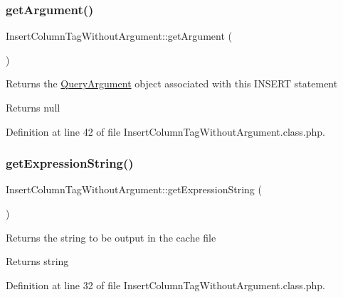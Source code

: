 \subsubsection{\texorpdfstring{get\+Argument()}{getArgument()}}
{\footnotesize\ttfamily Insert\+Column\+Tag\+Without\+Argument\+::get\+Argument (\begin{DoxyParamCaption}{ }\end{DoxyParamCaption})}

Returns the \hyperlink{classQueryArgument}{Query\+Argument} object associated with this I\+N\+S\+E\+RT statement

\begin{DoxyReturn}{Returns}
null 
\end{DoxyReturn}


Definition at line 42 of file Insert\+Column\+Tag\+Without\+Argument.\+class.\+php.

\hypertarget{classInsertColumnTagWithoutArgument_a0ea3febe1aed5e5f0fd8ac97fb0a8ac6}{}\label{classInsertColumnTagWithoutArgument_a0ea3febe1aed5e5f0fd8ac97fb0a8ac6} 
\subsubsection{\texorpdfstring{get\+Expression\+String()}{getExpressionString()}}
{\footnotesize\ttfamily Insert\+Column\+Tag\+Without\+Argument\+::get\+Expression\+String (\begin{DoxyParamCaption}{ }\end{DoxyParamCaption})}

Returns the string to be output in the cache file

\begin{DoxyReturn}{Returns}
string 
\end{DoxyReturn}


Definition at line 32 of file Insert\+Column\+Tag\+Without\+Argument.\+class.\+php.

\hypertarget{classInsertColumnTagWithoutArgument_ae1e10363dd8d24dff6cd05ca7711e455}{}\label{classInsertColumnTagWithoutArgument_ae1e10363dd8d24dff6cd05ca7711e455} 
